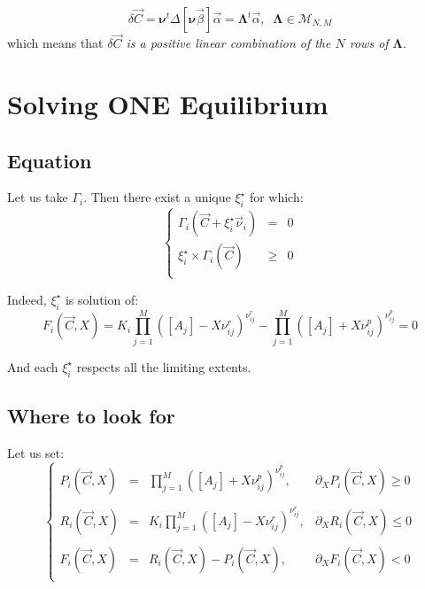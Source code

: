 \documentclass[aps,12pt]{revtex4}
\begin{document}
\begin{equation}
	\delta\vec{C} = \bm{\nu}^t \Delta[\bm{\nu} \vec{\beta}] \vec{\alpha} = \bm{\Lambda}^t \vec{\alpha}, \;\;  \bm{\Lambda} \in \mathcal{M}_{N,M}
\end{equation}
which means that \emph{ $\delta\vec{C}$ is a positive linear combination of the $N$ rows of $\bm{\Lambda}$}.

\section{Solving ONE Equilibrium}

\subsection{Equation}
Let us take $\Gamma_i$.
Then there exist a unique $\xi_i^\star$ for which:
\begin{equation}
\left\lbrace
\begin{array}{rcl}
	\Gamma_i(\vec{C} + \xi_i^\star \vec{\nu}_i ) & = & 0\\
	 \xi_i^\star \times \Gamma_i(\vec{C}) &\geq  &0\\
\end{array}
\right.
\end{equation}
 
Indeed, $\xi_i^\star$ is solution of:
\begin{equation}
	 F_i(\vec{C},X) =  K_i \prod_{j=1}^{M} \left([A_j] - X \nu^r_{ij}\right)^{\nu^r_{ij}} 
	- \prod_{j=1}^{M} \left([A_j] + X \nu^p_{ij} \right)^{\nu^p_{ij}} = 0
\end{equation} 

And each $\xi_i^\star$ respects all the limiting extents.

\subsection{Where to look for}
Let us set:
\begin{equation}
\left\lbrace
\begin{array}{rcll}
	P_i(\vec{C},X) & = & \displaystyle \prod_{j=1}^{M} \left([A_j] + X \nu^p_{ij} \right)^{\nu^p_{ij}}, & \partial_X P_i(\vec{C},X) \geq 0 \\
	\\
	R_i(\vec{C},X) & = & \displaystyle K_i \prod_{j=1}^{M} \left([A_j] - X \nu^r_{ij}\right)^{\nu^r_{ij}}, & \partial_X R_i(\vec{C},X) \leq 0 \\
	\\
	 F_i(\vec{C},X) & = & R_i(\vec{C},X)  - P_i(\vec{C},X), & \partial_X F_i(\vec{C},X) < 0\\
\end{array}
\right.
\end{equation}
\end{document}
